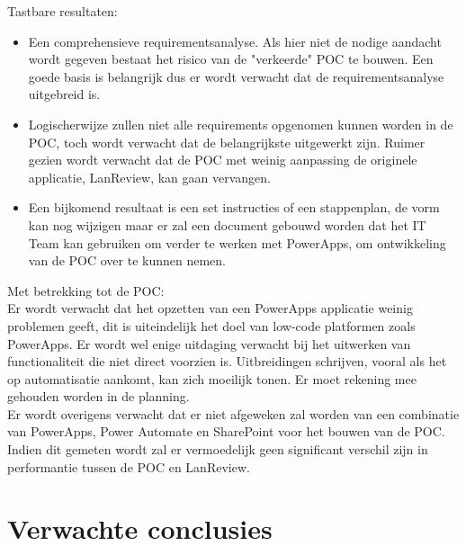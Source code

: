 Tastbare resultaten:
\begin{itemize}
    \item Een comprehensieve requirementsanalyse. Als hier niet de nodige aandacht wordt gegeven bestaat het risico van de "verkeerde" POC te bouwen. Een goede basis is belangrijk dus er wordt verwacht dat de requirementsanalyse uitgebreid is.
    \item Logischerwijze zullen niet alle requirements opgenomen kunnen worden in de POC, toch wordt verwacht dat de belangrijkste uitgewerkt zijn. Ruimer gezien wordt verwacht dat de POC met weinig aanpassing de originele applicatie, LanReview, kan gaan vervangen.
    \item Een bijkomend resultaat is een set instructies of een stappenplan, de vorm kan nog wijzigen maar er zal een document gebouwd worden dat het IT Team kan gebruiken om verder te werken met PowerApps, om ontwikkeling van de POC over te kunnen nemen.
\end{itemize}


\vspace{5mm}

Met betrekking tot de POC:\\
Er wordt verwacht dat het opzetten van een PowerApps applicatie weinig problemen geeft, dit is uiteindelijk het doel van low-code platformen zoals PowerApps. Er wordt wel enige uitdaging verwacht bij het uitwerken van functionaliteit die niet direct voorzien is. Uitbreidingen schrijven, vooral als het op automatisatie aankomt, kan zich moeilijk tonen. Er moet rekening mee gehouden worden in de planning.\\
Er wordt overigens verwacht dat er niet afgeweken zal worden van een combinatie van PowerApps, Power Automate en SharePoint voor het bouwen van de POC.\\
Indien dit gemeten wordt zal er vermoedelijk geen significant verschil zijn in performantie tussen de POC en LanReview.

\section{Verwachte conclusies}
\label{sec:verwachte_conclusies}

